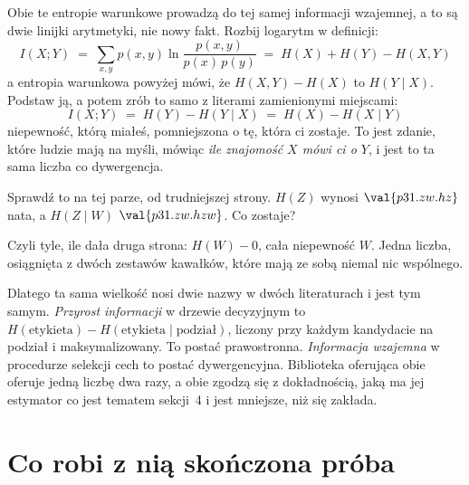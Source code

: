 \begin{fr}
Obie te entropie warunkowe prowadzą do tej samej informacji wzajemnej, a to
są dwie linijki arytmetyki, nie nowy fakt. Rozbij logarytm w definicji:
\[ I(X; Y) \;=\; \sum_{x, y} p(x, y) \ln \frac{p(x, y)}{p(x)\,p(y)}
   \;=\; H(X) + H(Y) - H(X, Y) \]
a entropia warunkowa powyżej mówi, że $H(X, Y) - H(X)$ to $H(Y \mid X)$.
Podstaw ją, a potem zrób to samo z literami zamienionymi miejscami:
\[ I(X; Y) \;=\; H(Y) - H(Y \mid X) \;=\; H(X) - H(X \mid Y) \]
\dash{} niepewność, którą miałeś, pomniejszona o tę, która ci zostaje. To
jest zdanie, które ludzie mają na myśli, mówiąc \emph{ile znajomość $X$ mówi
ci o $Y$}, i jest to ta sama liczba co dywergencja.

Sprawdź to na tej parze, od trudniejszej strony. $H(Z)$ wynosi
$\val{p31.zw.hz}$ nata, a $H(Z \mid W)$ \dash{} $\val{p31.zw.hzw}$. Co
zostaje?
\dotline
\nextframe
\end{fr}

\begin{fr}

Czyli tyle, ile dała druga strona: $H(W) - 0$, cała niepewność $W$. Jedna
liczba, osiągnięta z dwóch zestawów kawałków, które mają ze sobą niemal nic
wspólnego.

\begin{aibox}
Dlatego ta sama wielkość nosi dwie nazwy w dwóch literaturach i jest tym
samym. \emph{Przyrost informacji} w drzewie decyzyjnym to
$H(\text{etykieta}) - H(\text{etykieta} \mid \text{podział})$, liczony przy
każdym kandydacie na podział i maksymalizowany. To postać prawostronna.
\emph{Informacja wzajemna} w procedurze selekcji cech to postać
dywergencyjna. Biblioteka oferująca obie oferuje jedną liczbę dwa razy, a
obie zgodzą się z dokładnością, jaką ma jej estymator \dash{} co jest
tematem sekcji~4 i jest mniejsze, niż się zakłada.
\end{aibox}

\end{fr}

\section{Co robi z nią skończona próba}
\label{sec:P31-estimation}

